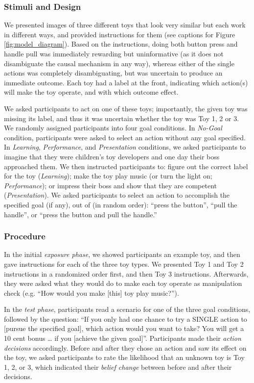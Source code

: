 \documentclass[10pt, letterpaper]{article}
\begin{document}
\subsubsection{Stimuli and Design}\label{stimuli-and-design}

We presented images of three different toys that look very similar but
each work in different ways, and provided instructions for them (see
captions for Figure \ref{fig:model_diagram}). Based on the instructions,
doing both button press and handle pull was immediately rewarding but
uninformative (as it does not disambiguate the causal mechanism in any
way), whereas either of the single actions was completely
disambiguating, but was uncertain to produce an immediate outcome. Each
toy had a label at the front, indicating which action(s) will make the
toy operate, and with which outcome effect.

We asked participants to act on one of these toys; importantly, the
given toy was missing its label, and thus it was uncertain whether the
toy was Toy 1, 2 or 3. We randomly assigned participants into four goal
conditions. In \emph{No-Goal} condition, participants were asked to
select an action without any goal specified. In \emph{Learning},
\emph{Performance}, and \emph{Presentation} conditions, we asked
participants to imagine that they were children's toy developers and one
day their boss approached them. We then instructed participants to:
figure out the correct label for the toy (\emph{Learning}); make the toy
play music (or turn the light on; \emph{Performance}); or impress their
boss and show that they are competent (\emph{Presentation}). We asked
participants to select an action to accomplish the specified goal (if
any), out of (in random order): ``press the button'', ``pull the
handle'', or ``press the button and pull the handle.''

\subsubsection{Procedure}\label{procedure}

In the initial \emph{exposure phase}, we showed participants an example
toy, and then gave instructions for each of the three toy types. We
presented Toy 1 and Toy 2 instructions in a randomized order first, and
then Toy 3 instructions. Afterwards, they were asked what they would do
to make each toy operate as manipulation check (e.g. ``How would you
make {[}this{]} toy play music?'').

In the \emph{test phase}, participants read a scenario for one of the
three goal conditions, followed by the question: ``If you only had one
chance to try a SINGLE action to {[}pursue the specified goal{]}, which
action would you want to take? You will get a 10 cent bonus \ldots{} if
you {[}achieve the given goal{]}''. Participants made their \emph{action
decisions} accordingly. Before and after they chose an action and saw
its effect on the toy, we asked participants to rate the likelihood that
an unknown toy is Toy 1, 2, or 3, which indicated their \emph{belief
change} between before and after their decisions.
\end{document}
